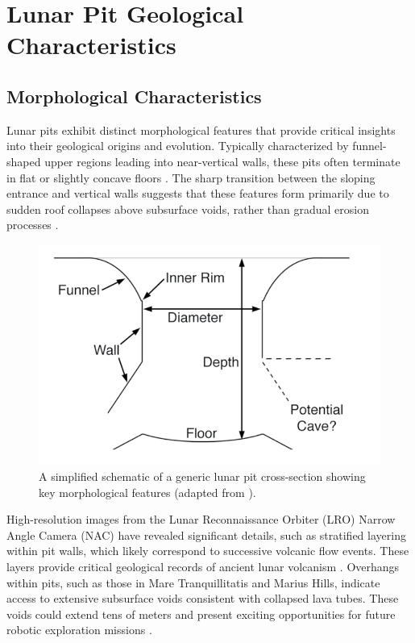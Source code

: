 \graphicspath{{img/ch2}}


\section{Lunar Pit Geological Characteristics}

\subsection{Morphological Characteristics}

Lunar pits exhibit distinct morphological features that provide critical insights into their geological origins and evolution. Typically characterized by funnel-shaped upper regions leading into near-vertical walls, these pits often terminate in flat or slightly concave floors \cite{new-wagner, lunar-pits-numerical-modelling, lunar-pit-distribution}. The sharp transition between the sloping entrance and vertical walls suggests that these features form primarily due to sudden roof collapses above subsurface voids, rather than gradual erosion processes \cite{lunar-pits-numerical-modelling, new-wagner}.

\begin{figure}[h!]
    \centering
    \includegraphics[width=0.5\linewidth]{lunar_pit_schema.png}
    \caption{A simplified schematic of a generic lunar pit cross-section showing key morphological features (adapted from \cite{new-wagner}).}
    \label{fig:lunar-pit-schema}
\end{figure}

High-resolution images from the Lunar Reconnaissance Orbiter (LRO) Narrow Angle Camera (NAC) have revealed significant details, such as stratified layering within pit walls, which likely correspond to successive volcanic flow events. These layers provide critical geological records of ancient lunar volcanism \cite{lunar-pits-entrances-to-caves, Carrer2024}. Overhangs within pits, such as those in Mare Tranquillitatis and Marius Hills, indicate access to extensive subsurface voids consistent with collapsed lava tubes. These voids could extend tens of meters and present exciting opportunities for future robotic exploration missions \cite{lunar-pits-numerical-modelling, radar-observations-lava-tubes}.

